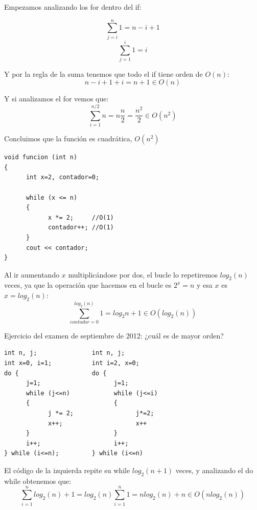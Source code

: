 \documentclass[10pt,a4paper,spanish]{report}
\begin{document}
\noindent
Empezamos analizando los for dentro del if:

\begin{displaymath}
\sum_{j=i}^{n} 1 = n - i + 1
\end{displaymath}
\begin{displaymath}
\sum_{j=1}^{i} 1 = i
\end{displaymath}

\noindent
Y por la regla de la suma tenemos que todo el if tiene orden de $O(n)$:
\begin{displaymath}
n - i + 1 + i = n + 1 \in O(n)
\end{displaymath}

\noindent
Y si analizamos el for vemos que:
\begin{displaymath}
\sum_{i=1}^{n/2} n = n \frac{n}{2} = \frac{n^{2}}{2} \in O(n^{2})
\end{displaymath}

\noindent
Concluimos que la función es cuadrática, $O(n^{2})$

\begin{verbatim}
void funcion (int n)
{
      int x=2, contador=0;

      while (x <= n)
      {
            x *= 2;     //O(1)
            contador++; //O(1)
      }
      cout << contador;
}
\end{verbatim}

\noindent
Al ir aumentando $x$ multiplicándose por dos, el bucle lo repetiremos $log_{2}(n)$ veces, ya que la operación que hacemos en el bucle es $2^{x}=n$ y esa $x$ es $x=log_{2}(n)$:
\begin{displaymath}
\sum_{contador=0}^{log_{2}(n)} 1 = log_{2} n + 1 \in O(log_{2}(n))
\end{displaymath}

\label{eficiencia_sept2012}
\noindent
Ejercicio del examen de septiembre de 2012: ¿cuál es de mayor orden?
\begin{verbatim}
int n, j;               int n, j;
int x=0, i=1;           int i=2, x=0;
do {                    do {
      j=1;                    j=1;
      while (j<=n)            while (j<=i)
      {                       {
            j *= 2;                 j*=2;
            x++;                    x++
      }                       }
      i++;                    i++;                               
} while (i<=n);         } while (i<=n)
\end{verbatim}

\noindent
El código de la izquierda repite su while $log_{2}(n+1)$ veces, y analizando el do while obtenemos que:
\begin{displaymath}
\sum_{i=1}^{n} log_{2} (n) + 1 = log_{2} (n) \sum_{i=1}^{n} 1 = nlog_{2}(n) + n \in O(nlog_{2}(n))
\end{displaymath}
\end{document}
